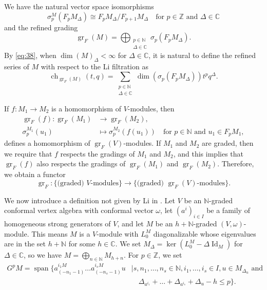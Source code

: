 \documentclass[a4paper, 12pt, reqno]{amsart}
\theoremstyle{remark}
\numberwithin{equation}{subsection}
\DeclareMathOperator{\Id}{Id}
\DeclareMathOperator{\gr}{gr}
\DeclareMathOperator{\ch}{ch}
\DeclareMathOperator{\vspan}{span}
\begin{document}
We have the natural vector space isomorphisms
\begin{equation*}
  \sigma^M_p(F_pM_{\Delta}) \cong F_pM_{\Delta}/F_{p + 1}M_{\Delta} \quad \text{for }p \in \mathbb{Z}\text{ and }\Delta \in \mathbb{C}
\end{equation*}
and the refined grading
\begin{equation}
  \label{eq:38}
  \gr_F(M) =\bigoplus_{\substack{p \in \mathbb{N} \\ \Delta \in \mathbb{C}}}\sigma_p(F_pM_{\Delta}).
\end{equation}
By \eqref{eq:38}, when $\dim(M)_{\Delta} < \infty$ for $\Delta \in \mathbb{C}$, it is natural to define the refined series of $M$ with respect to the Li filtration as
\begin{equation*}
  \ch_{\gr_F(M)}(t, q) = \sum_{\substack{p \in \mathbb{N} \\ \Delta \in \mathbb{C}}}\dim(\sigma_p(F_pM_{\Delta}))t^pq^{\Delta}.
\end{equation*}

If $f: M_1 \to M_2$ is a homomorphism of $V$-modules, then
\begin{align*}
  \gr_F(f): \gr_F(M_1) &\to \gr_F(M_2), \\
  \sigma^{M_1}_p(u_1) &\mapsto \sigma^{M_2}_p(f(u_1)) \quad \text{for }p \in \mathbb{N}\text{ and }u_1 \in F_pM_1,
\end{align*}
defines a homomorphism of $\gr_F(V)$-modules.
If $M_1$ and $M_2$ are graded, then we require that $f$ respects the gradings of $M_1$ and $M_2$, and this implies that $\gr_F(f)$ also respects the gradings of $\gr_F(M_1)$ and $\gr_F(M_2)$.
Therefore, we obtain a functor
\begin{equation*}
  \gr_F: \{\text{(graded) $V$-modules}\} \to \{\text{(graded) $\gr_F(V)$-modules}\}.
\end{equation*}

We now introduce a definition not given by Li in \cite{li_vertex_2004}.
Let $V$ be an $\mathbb{N}$-graded conformal vertex algebra with conformal vector $\omega$, let $(a^i)_{i \in I}$ be a family of homogeneous strong generators of $V$, and let $M$ be an $h + \mathbb{N}$-graded $(V, \omega)$-module.
This means $M$ is a $V$-module with $L_0^M$ diagonalizable whose eigenvalues are in the set $h + \mathbb{N}$ for some $h \in \mathbb{C}$.
We set $M_{\Delta} = \ker(L^M_0 - \Delta\Id_M)$ for $\Delta \in \mathbb{C}$, so we have $M = \bigoplus_{n \in \mathbb{N}}M_{h + n}$.
For $p \in \mathbb{Z}$, we set
\begin{equation*}
  \begin{split}
    G^pM = \vspan\{a^{i_1M}_{(-n_1 - 1)}\dots a^{i_sM}_{(-n_s - 1)}u &\mid s, n_1, \dots, n_s \in \mathbb{N}, i_1, \dots, i_s \in I, u \in M_{\Delta_u} \text{ and }\\
    &\quad \Delta_{a^{i_1}} + \dots + \Delta_{a^{i_s}} + \Delta_u - h \le p\}.
  \end{split}
\end{equation*}
\end{document}
